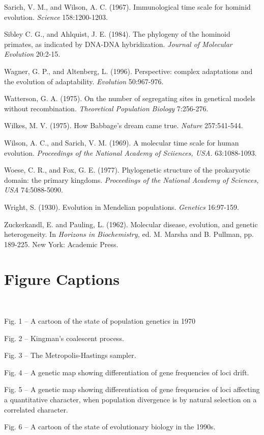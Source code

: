 \documentclass[12pt]{article}
\begin{document}
{Sarich, V. M., and Wilson, A. C.  (1967).  Immunological time scale for
hominid evolution. {\it Science}  158:1200-1203.

Sibley C. G., and Ahlquist, J. E. (1984).  The phylogeny of the hominoid primates, as
indicated by DNA-DNA hybridization. {\it Journal of Molecular Evolution}  20:2-15.

Wagner, G. P., and Altenberg, L.  (1996).  Perspective: complex adaptations and
the evolution of adaptability.  {\it Evolution}  50:967-976.

Watterson, G. A.  (1975).  On the number of segregating sites in genetical
models without recombination.  {\it Theoretical Population Biology}  7:256-276.

Wilkes, M. V.  (1975).  How Babbage's dream came true.  {\it Nature}   257:541-544.

Wilson, A. C., and Sarich, V. M.  (1969).  A molecular time scale for human
evolution.  {\it Proceedings of the National Academy of Sciiences, USA.}  63:1088-1093.

Woese, C. R., and Fox, G. E.  (1977).
Phylogenetic structure of the prokaryotic domain: the primary kingdoms.
{\it Proceedings of the National Academy of Sciences, USA}  74:5088-5090.

Wright, S. (1930).  Evolution in Mendelian populations.
{\it Genetics}  16:97-159.

Zuckerkandl, E. and Pauling, L.  (1962).  Molecular disease, evolution, and
genetic heterogeneity.  In {\it Horizons in Biochemistry,}
ed. M. Marsha and B. Pullman, pp. 189-225. New York: Academic Press.

\newpage

\section*{Figure Captions}
\bigskip

{~~}

Fig. 1 -- A cartoon of the state of population genetics in 1970
\bigskip

Fig. 2 -- Kingman's coalescent process.
\bigskip

Fig. 3 -- The Metropolis-Hastings sampler.
\bigskip

Fig. 4 -- A genetic map showing differentiation of gene frequencies of loci
drift.
\bigskip

Fig. 5 -- A genetic map showing differentiation of gene frequencies of loci
affecting a quantitative character, when population divergence is by
natural selection on a correlated character.
\bigskip

Fig. 6 -- A cartoon of the state of evolutionary biology in the 1990s.
\bigskip

}
\newpage
\end{document}
